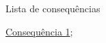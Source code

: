 \begin{titlemize}{Lista de consequências}
	\item \hyperref[consequencia1]{Consequência 1};\\ %
	\item \hyperref[]{}
\end{titlemize}

